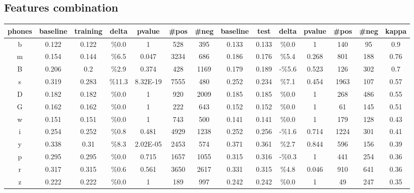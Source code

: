\subsection{Features combination}

\begin{table}[H]
\tiny{
\centering
\renewcommand{\arraystretch}{2}

\begin{tabular}{|c| |c|c|c|c|c|c| |c|c|c|c|c|c| |c|}
\hline
phones & baseline & training & delta & pvalue & \#pos & \#neg & baseline & test & delta & pvalue & \#pos & \#neg & kappa \\ \hline
b & 0.122 & 0.122 & \%0.0 & 1 & 528 & 395 & 0.133 & 0.133 & \%0.0 & 1 & 140 & 95 & 0.9 \\ \hline
\rowcolor{lightgray} m & 0.154 & 0.144 & \%6.5 & 0.047 & 3234 & 686 & 0.186 & 0.176 & \%5.4 & 0.268 & 801 & 188 & 0.76 \\ \hline
B & 0.206 & 0.2 & \%2.9 & 0.374 & 428 & 1169 & 0.179 & 0.189 & -\%5.6 & 0.523 & 126 & 302 & 0.7 \\ \hline
\rowcolor{lightgray} s & 0.319 & 0.283 & \%11.3 & 8.32E-19 & 7555 & 480 & 0.252 & 0.234 & \%7.1 & 0.454 & 1963 & 107 & 0.57 \\ \hline
D & 0.182 & 0.182 & \%0.0 & 1 & 920 & 2009 & 0.185 & 0.185 & \%0.0 & 1 & 268 & 486 & 0.55 \\ \hline
G & 0.162 & 0.162 & \%0.0 & 1 & 222 & 643 & 0.152 & 0.152 & \%0.0 & 1 & 61 & 145 & 0.51 \\ \hline
w & 0.151 & 0.151 & \%0.0 & 1 & 743 & 500 & 0.141 & 0.141 & \%0.0 & 1 & 179 & 128 & 0.43 \\ \hline
i & 0.254 & 0.252 & \%0.8 & 0.481 & 4929 & 1238 & 0.252 & 0.256 & -\%1.6 & 0.714 & 1224 & 301 & 0.41 \\ \hline
\rowcolor{lightgray} y & 0.338 & 0.31 & \%8.3 & 2.02E-05 & 2453 & 574 & 0.371 & 0.361 & \%2.7 & 0.844 & 596 & 156 & 0.39 \\ \hline
p & 0.295 & 0.295 & \%0.0 & 0.715 & 1657 & 1055 & 0.315 & 0.316 & -\%0.3 & 1 & 441 & 254 & 0.36 \\ \hline
r & 0.317 & 0.315 & \%0.6 & 0.561 & 3650 & 2617 & 0.331 & 0.315 & \%4.8 & 0.046 & 910 & 641 & 0.36 \\ \hline
z & 0.222 & 0.222 & \%0.0 & 1 & 189 & 997 & 0.242 & 0.242 & \%0.0 & 1 & 49 & 247 & 0.35 \\ \hline

\end{tabular}}
\end{table}
